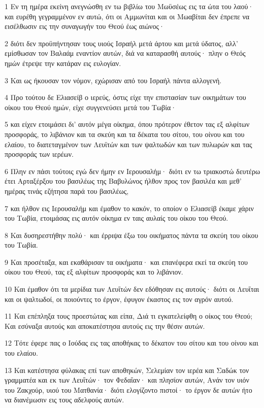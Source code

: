 \par 1 Εν τη ημέρα εκείνη ανεγνώσθη εν τω βιβλίω του Μωϋσέως εις τα ώτα του λαού· και ευρέθη γεγραμμένον εν αυτώ, ότι οι Αμμωνίται και οι Μωαβίται δεν έπρεπε να εισέλθωσιν εις την συναγωγήν του Θεού έως αιώνος·
\par 2 διότι δεν προϋπήντησαν τους υιούς Ισραήλ μετά άρτου και μετά ύδατος, αλλ' εμίσθωσαν τον Βαλαάμ εναντίον αυτών, διά να καταρασθή αυτούς· πλην ο Θεός ημών έτρεψε την κατάραν εις ευλογίαν.
\par 3 Και ως ήκουσαν τον νόμον, εχώρισαν από του Ισραήλ πάντα αλλογενή.
\par 4 Προ τούτου δε Ελιασείβ ο ιερεύς, όστις είχε την επιστασίαν των οικημάτων του οίκου του Θεού ημών, είχε συγγενεύσει μετά του Τωβία·
\par 5 και είχεν ετοιμάσει δι' αυτόν μέγα οίκημα, όπου πρότερον έθετον τας εξ αλφίτων προσφοράς, το λιβάνιον και τα σκεύη και τα δέκατα του σίτου, του οίνου και του ελαίου, το διατεταγμένον των Λευϊτών και των ψαλτωδών και των πυλωρών και τας προσφοράς των ιερέων.
\par 6 Πλην εν πάσι τούτοις εγώ δεν ήμην εν Ιερουσαλήμ· διότι εν τω τριακοστώ δευτέρω έτει Αρταξέρξου του βασιλέως της Βαβυλώνος ήλθον προς τον βασιλέα και μεθ' ημέρας τινάς εζήτησα παρά του βασιλέως,
\par 7 και ήλθον εις Ιερουσαλήμ και έμαθον το κακόν, το οποίον ο Ελιασείβ έκαμε χάριν του Τωβία, ετοιμάσας εις αυτόν οίκημα εν ταις αυλαίς του οίκου του Θεού.
\par 8 Και δυσηρεστήθην πολύ· και έρριψα έξω του οικήματος πάντα τα σκεύη του οίκου του Τωβία.
\par 9 Και προσέταξα, και εκαθάρισαν τα οικήματα· και επανέφερα εκεί τα σκεύη του οίκου του Θεού, τας εξ αλφίτων προσφοράς και το λιβάνιον.
\par 10 Και έμαθον ότι τα μερίδια των Λευΐτών δεν εδόθησαν εις αυτούς· διότι οι Λευΐται και οι ψαλτωδοί, οι ποιούντες το έργον, έφυγον έκαστος εις τον αγρόν αυτού.
\par 11 Και επέπληξα τους προεστώτας και είπα, Διά τι εγκατελείφθη ο οίκος του Θεού; Και εσύναξα αυτούς και αποκατέστησα αυτούς εις την θέσιν αυτών.
\par 12 Τότε έφερε πας ο Ιούδας εις τας αποθήκας το δέκατον του σίτου και του οίνου και του ελαίου.
\par 13 Και κατέστησα φύλακας επί των αποθηκών, Σελεμίαν τον ιερέα και Σαδώκ τον γραμματέα και εκ των Λευΐτών· τον Φεδαΐαν· και πλησίον αυτών, Ανάν τον υιόν του Ζακχούρ, υιού του Ματθανία· διότι ελογίζοντο πιστοί· το έργον δε αυτών ήτο να διανέμωσιν εις τους αδελφούς αυτών.
